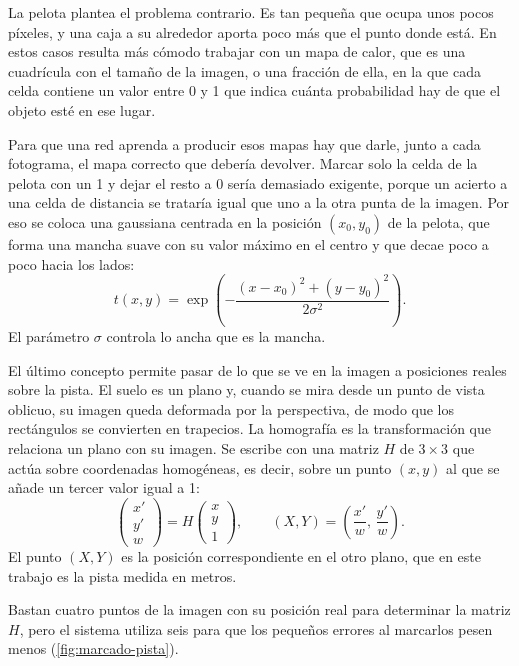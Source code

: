 La pelota plantea el problema contrario.
Es tan pequeña que ocupa unos pocos píxeles, y una caja a su alrededor aporta poco más que el punto donde está.
En estos casos resulta más cómodo trabajar con un mapa de calor, que es una cuadrícula con el tamaño de la imagen, o una fracción de ella, en la que cada celda contiene un valor entre 0 y 1 que indica cuánta probabilidad hay de que el objeto esté en ese lugar.

Para que una red aprenda a producir esos mapas hay que darle, junto a cada fotograma, el mapa correcto que debería devolver.
Marcar solo la celda de la pelota con un 1 y dejar el resto a 0 sería demasiado exigente, porque un acierto a una celda de distancia se trataría igual que uno a la otra punta de la imagen.
Por eso se coloca una gaussiana centrada en la posición $(x_0, y_0)$ de la pelota, que forma una mancha suave con su valor máximo en el centro y que decae poco a poco hacia los lados:
\begin{equation}
  t(x, y) = \exp\!\left( -\frac{(x - x_0)^2 + (y - y_0)^2}{2\sigma^2} \right).
  \label{eq:gaussiana}
\end{equation}
El parámetro $\sigma$ controla lo ancha que es la mancha.

El último concepto permite pasar de lo que se ve en la imagen a posiciones reales sobre la pista.
El suelo es un plano y, cuando se mira desde un punto de vista oblicuo, su imagen queda deformada por la perspectiva, de modo que los rectángulos se convierten en trapecios.
La homografía es la transformación que relaciona un plano con su imagen.
Se escribe con una matriz $H$ de $3 \times 3$ que actúa sobre coordenadas homogéneas, es decir, sobre un punto $(x, y)$ al que se añade un tercer valor igual a 1:
\begin{equation}
  \begin{pmatrix} x' \\ y' \\ w \end{pmatrix} = H \begin{pmatrix} x \\ y \\ 1 \end{pmatrix}, \qquad
  (X, Y) = \left( \frac{x'}{w},\, \frac{y'}{w} \right).
  \label{eq:homografia}
\end{equation}
El punto $(X, Y)$ es la posición correspondiente en el otro plano, que en este trabajo es la pista medida en metros.

Bastan cuatro puntos de la imagen con su posición real para determinar la matriz $H$, pero el sistema utiliza seis para que los pequeños errores al marcarlos pesen menos (\cref{fig:marcado-pista}).

